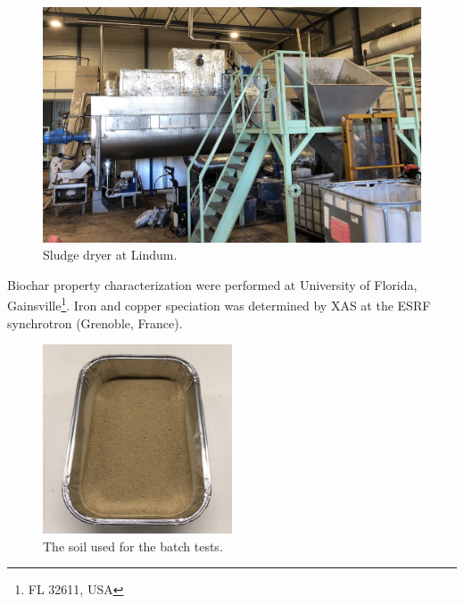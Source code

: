 \begin{figure}
    \centering
    \includegraphics[width=0.7\linewidth,scale=0.7]{Bilder/Pyrolysis/Dryer.jpg}
    \caption{Sludge dryer at Lindum.}
    \label{fig:dryer}
\end{figure}

Biochar property characterization were performed at University of Florida, Gainsville\footnote{FL 32611, USA}. Iron and copper speciation was determined by XAS at the ESRF synchrotron (Grenoble, France).

\begin{figure}
    \centering
    \includegraphics[width=0.5\textwidth]{Bilder/Samples/Soil_blank.JPG}
    \caption{The soil used for the batch tests.}
    \label{fig:soil}
\end{figure}